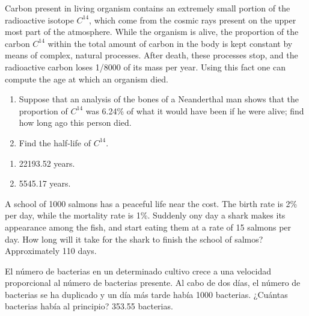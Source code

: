 {Carbon present in living organism contains an extremely small portion of the radioactive isotope $C^{14}$, which come from the cosmic rays present on the upper most part of the atmosphere.
While the organism is alive, the proportion of the carbon $C^{14}$ within the total amount of carbon in the body is kept constant by means of complex, natural processes.
After death, these processes stop, and the radioactive carbon loses 1/8000 of its mass per year.
Using this fact one can compute the age at which an organism died.
\begin{enumerate}
\item Suppose that an analysis of the bones of a Neanderthal man shows that the proportion of $C^{14}$ was 6.24\% of what it would have been if he were alive; find how long ago this person died.
\item Find the half-life of $C^{14}$.
\end{enumerate}
}
{
\begin{enumerate}
\item 22193.52 years.
\item 5545.17 years.
\end{enumerate}
}
{}


{A school of 1000 salmons has a peaceful life near the cost.
The birth rate is 2\% per day, while the mortality rate is 1\%.
Suddenly ony day a shark makes its appearance among the fish, and start eating them at a rate
of 15 salmons per day.
How long will it take for the shark to finish the school of salmos?
}
{Approximately 110 days.
}
{}


{El número de bacterias en un determinado cultivo crece a una velocidad proporcional al número de bacterias presente.
Al cabo de dos días, el número de bacterias se ha duplicado y un día más tarde había 1000 bacterias.
¿Cuántas bacterias había al principio?
}
{353.55 bacterias.
}
{}
